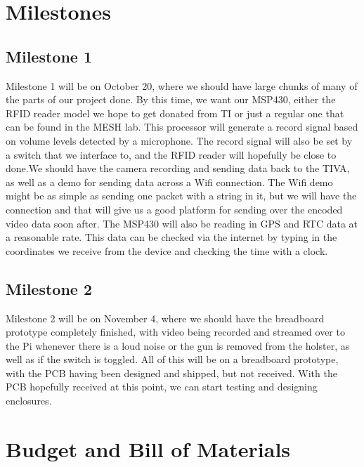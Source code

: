 \documentclass[12pt]{article}
\begin{document}
\section{Milestones}

\subsection{Milestone 1}

Milestone 1 will be on October 20, where we should have large chunks of many of
the parts of our project done. By this time, we want our MSP430, either the
RFID reader model we hope to get donated from TI or just a regular one that can
be found in the MESH lab. This processor will generate a record signal based on
volume levels detected by a microphone. The record signal will also be set by a
switch that we interface to, and the RFID reader will hopefully be close to
done.We should have the camera recording and sending data back to the TIVA, as
well as a demo for sending data across a Wifi connection. The Wifi demo might
be as simple as sending one packet with a string in it, but we will have the
connection and that will give us a good platform for sending over the encoded
video data soon after. The MSP430 will also be reading in GPS and RTC data at a
reasonable rate. This data can be checked via the internet by typing in the
coordinates we receive from the device and checking the time with a clock. 

\subsection{Milestone 2}

Milestone 2 will be on November 4, where we should have the breadboard
prototype completely finished, with video being recorded and streamed over to
the Pi whenever there is a loud noise or the gun is removed from the holster,
as well as if the switch is toggled. All of this will be on a breadboard
prototype, with the PCB having been designed and shipped, but not received.
With the PCB hopefully received at this point, we can start testing and
designing enclosures.

\section{Budget and Bill of Materials}
\end{document}
